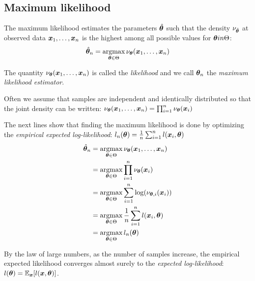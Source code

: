 \subsection{Maximum likelihood}
The maximum likelihood estimates the parameters $\hat{\boldsymbol{\theta}}$ such that the
density $\nu_{\hat{\boldsymbol{\theta}}}$ at observed data $\boldsymbol{x}_1, \dots, \boldsymbol{x}_n$ is the highest among all possible
values for $\boldsymbol{\theta} in \Theta$:
\begin{align}
  \hat{\boldsymbol{\theta}}_n = \operatorname*{argmax}_{\boldsymbol{\theta} \in \Theta} \nu_{\boldsymbol{\theta}}(\boldsymbol{x}_1, \dots, \boldsymbol{x}_n)
\end{align}

The quantity $\nu_{\boldsymbol{\theta}}(\boldsymbol{x}_1, \dots, \boldsymbol{x}_n)$ is called the
\emph{likelihood} and we call $\boldsymbol{\theta}_n$ the \emph{maximum likelihood estimator}.

Often we assume that samples are independent and identically distributed so that
the joint density can be written:
$\nu_{\boldsymbol{\theta}}(\boldsymbol{x}_1, \dots, \boldsymbol{x}_n) = \prod_{i=1}^n \nu_{\boldsymbol{\theta}}(\boldsymbol{x}_i)$

The next lines show that finding the maximum likelihood is done by optimizing
the \emph{empirical expected log-likelihood}: $l_n(\boldsymbol{\theta}) = \frac1n
\sum_{i=1}^n l(\boldsymbol{x}_i, \boldsymbol{\theta})$ 
\begin{align}
  \hat{\boldsymbol{\theta}}_n &= \operatorname*{argmax}_{\boldsymbol{\theta} \in \Theta} \nu_{\boldsymbol{\theta}}(\boldsymbol{x}_1, \dots, \boldsymbol{x}_n) \\
               &= \operatorname*{argmax}_{\boldsymbol{\theta} \in \Theta} \prod_{i=1}^n \nu_{\boldsymbol{\theta}}(\boldsymbol{x}_i) \\ 
               &= \operatorname*{argmax}_{\boldsymbol{\theta} \in \Theta} \sum_{i=1}^n \log(\nu_{\boldsymbol{\theta}, i}(\boldsymbol{x}_i))  \\
               &= \operatorname*{argmax}_{\boldsymbol{\theta} \in \Theta} \frac1n \sum_{i=1}^n l(\boldsymbol{x}_i, \boldsymbol{\theta}) \\ 
                  &= \operatorname*{argmax}_{\boldsymbol{\theta} \in \Theta} l_n(\boldsymbol{\theta}) \\ 
\end{align}

By the law of large numbers, as the number of samples increase, the empirical
expected likelihood converges almost surely to the \emph{expected
  log-likelihood}: $l(\boldsymbol{\theta}) = \mathbb{E}_{\boldsymbol{x}}[l(\boldsymbol{x}, \boldsymbol{\theta})]$.

